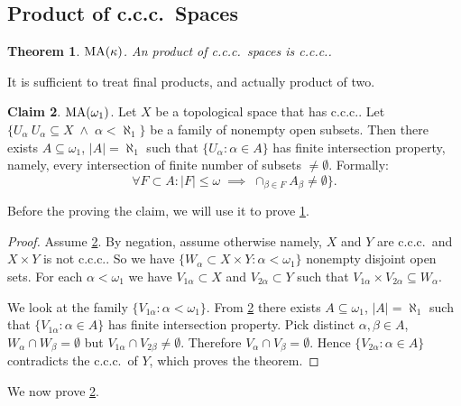 \documentclass[11pt,pdftex,twoside,a4paper]{article}
\newcommand{\MA}{\ensuremath{\mathop{\rm MA}\nolimits}}
\newcommand{\ccc}{c.c.c.}
\newtheorem{thm}{Theorem}[section]
\theoremstyle{definition}
\newtheorem{claim}[thm]{Claim}
\begin{document}
\subsection{Product of \ccc\ Spaces}

\begin{thm} \label{thm:prod:ccc}
\(\MA(\kappa)\).
An product of \ccc\ spaces is \ccc.
\end{thm}
It is sufficient to treat final products, and actually product of two.
\begin{claim} \label{claim:open:subset:finite:sect}
\(\MA(\omega_1)\).
Let $X$ be a topological space that has \ccc.
Let \(\{U_\alpha \: U_\alpha\subseteq X \;\land\; \alpha < \aleph_1\}\) 
be a family of nonempty open subsets.
Then there exists \(A \subseteq \omega_1\), \(|A|=\aleph_1\)
such that \(\{U_\alpha: \alpha\in A\}\)
has finite intersection property, 
namely, every intersection of finite number of subsets \(\neq\emptyset\).
Formally:
\begin{equation*}
\forall F\subset A: |F|\leq \omega\;\implies\; 
  \cap_{\beta\in F} A_\beta \neq \emptyset\}.
\end{equation*}
\end{claim}
Before the proving the claim, we will use it to prove \ref{thm:prod:ccc}.
\begin{proof}
Assume \ref{claim:open:subset:finite:sect}.
By negation, assume otherwise namely, $X$ and $Y$ are \ccc\ 
and \(X\times Y\) is not \ccc.
So we have \(\{W_\alpha \subset X\times Y:\alpha<\omega_1\}\)
nonempty disjoint open sets. For each \(\alpha<\omega_1\)
we have \(V_{1\alpha}\subset X\) and \(V_{2\alpha}\subset Y\) such that
\(V_{1\alpha}\times V_{2\alpha} \subseteq W_\alpha \).

We look at the family \(\{V_{1\alpha}:\alpha<\omega_1\}\).
From \ref{claim:open:subset:finite:sect} there exists \(A\subseteq \omega_1\),
\(|A|=\aleph_1\) such that \(\{V_{1\alpha}:\alpha\in A\}\)
has finite intersection property.
Pick distinct \(\alpha,\beta\in A\), \(W_\alpha\cap W_\beta=\emptyset\)
but \(V_{1\alpha}\cap V_{2\beta} \neq \emptyset\). Therefore 
\(V_\alpha\cap V_\beta = \emptyset\).
Hence \(\{V_{2\alpha}:\alpha\in A\}\) contradicts the \ccc\ of $Y$,
which proves the theorem.
\end{proof}
We now prove \ref{claim:open:subset:finite:sect}.
\end{document}
